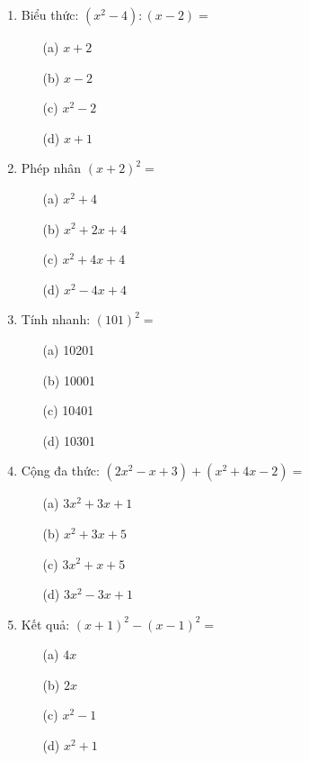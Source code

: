 \documentclass[12pt]{article}
\begin{document}
\begin{multicols}{2}
\begin{enumerate}
    \item Biểu thức: $(x^2 - 4) : (x - 2) =$
    \begin{itemize}
        \item[(a)] $x + 2$
        \item[(b)] $x - 2$
        \item[(c)] $x^2 - 2$
        \item[(d)] $x + 1$
    \end{itemize}

    \item Phép nhân $(x + 2)^2 =$
    \begin{itemize}
        \item[(a)] $x^2 + 4$
        \item[(b)] $x^2 + 2x + 4$
        \item[(c)] $x^2 + 4x + 4$
        \item[(d)] $x^2 - 4x + 4$
    \end{itemize}

    \item Tính nhanh: $(101)^2 =$
    \begin{itemize}
        \item[(a)] 10201
        \item[(b)] 10001
        \item[(c)] 10401
        \item[(d)] 10301
    \end{itemize}

    \item Cộng đa thức: $(2x^2 - x + 3) + (x^2 + 4x - 2) =$
    \begin{itemize}
        \item[(a)] $3x^2 + 3x + 1$
        \item[(b)] $x^2 + 3x + 5$
        \item[(c)] $3x^2 + x + 5$
        \item[(d)] $3x^2 - 3x + 1$
    \end{itemize}

    \item Kết quả: $(x + 1)^2 - (x - 1)^2 =$
    \begin{itemize}
        \item[(a)] $4x$
        \item[(b)] $2x$
        \item[(c)] $x^2 - 1$
        \item[(d)] $x^2 + 1$
    \end{itemize}
\end{enumerate}
\end{multicols}
\end{document}
